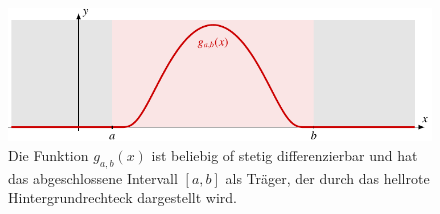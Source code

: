 %
%
%
\begin{figure}
\centering
\includegraphics{chapters/030-kurvenintegral/images/gab.pdf}
\caption{Die Funktion $g_{a,b}(x)$ ist beliebig of stetig differenzierbar
und hat das abgeschlossene Intervall $[a,b]$ als Träger,
der durch das hellrote Hintergrundrechteck dargestellt wird.
\label{buch:kurvenintegral:fig:gab}}
\end{figure}
